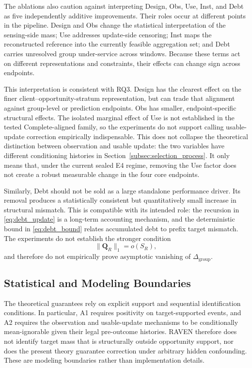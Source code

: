 \documentclass[letterpaper,journal]{IEEEtran}
\begin{document}
The ablations also caution against interpreting Design, Obs, Use, Inst, and
Debt as five independently additive improvements.  Their roles occur at
different points in the pipeline.  Design and Obs change the statistical
interpretation of the sensing-side mass; Use addresses update-side censoring;
Inst maps the reconstructed reference into the currently feasible aggregation
set; and Debt carries unresolved group under-service across windows.  Because
these terms act on different representations and constraints, their effects can
change sign across endpoints.

This interpretation is consistent with RQ3.  Design has the clearest effect on
the finer client--opportunity-stratum representation, but can trade that
alignment against group-level or prediction endpoints.  Obs has smaller,
endpoint-specific structural effects.  The isolated marginal effect of Use is
not established in the tested Complete-aligned family, so the experiments do
not support calling usable-update correction empirically indispensable.  This
does not collapse the theoretical distinction between observation and usable
update: the two variables have different conditioning histories in
Section~\ref{subsec:selection_process}.  It only means that, under the current
sealed E4 regime, removing the Use factor does not create a robust measurable
change in the four core endpoints.

Similarly, Debt should not be sold as a large standalone performance driver.
Its removal produces a statistically consistent but quantitatively small
increase in structural mismatch.  This is compatible with its intended role:
the recursion in \eqref{eq:debt_update} is a long-term accounting mechanism,
and the deterministic bound in \eqref{eq:debt_bound} relates accumulated debt
to prefix target mismatch.  The experiments do not establish the stronger
condition
\begin{equation}
    \|\mathbf Q_R\|_1=o(S_R),
\end{equation}
and therefore do not empirically prove asymptotic vanishing of
$\Delta_{\mathrm{group}}$.

\subsection{Statistical and Modeling Boundaries}
\label{subsec:discussion_statistical_limits}

The theoretical guarantees rely on explicit support and sequential
identification conditions.  In particular, A1 requires positivity on
target-supported events, and A2 requires the observation and usable-update
mechanisms to be conditionally mean-ignorable given their legal pre-outcome
histories.  RAVEN therefore does not identify target mass that is structurally
outside opportunity support, nor does the present theory guarantee correction
under arbitrary hidden confounding.  These are modeling boundaries rather than
implementation details.
\end{document}
